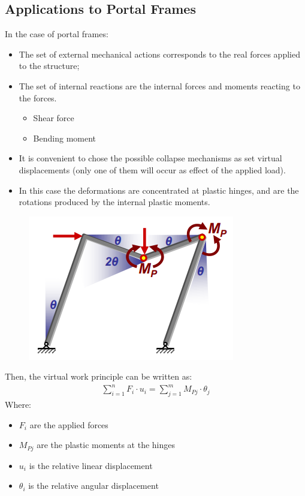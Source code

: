 \documentclass[class=report, crop=false, 12pt,a4paper]{standalone}
\begin{document}
\subsection{Applications to Portal Frames}
In the case of portal frames:
\begin{itemize}
  \item The set of external mechanical actions corresponds to the real forces applied to the structure;
  \item The set of internal reactions are the internal forces and moments reacting to the forces.
  \begin{itemize}
    \item Shear force
    \item Bending moment
  \end{itemize}
  \item It is convenient to chose the possible collapse mechanisms as set virtual displacements (only one of them will occur as effect of the applied load).
  \item In this case the deformations are concentrated at plastic hinges, and are the rotations produced by the internal plastic moments. 
\end{itemize}
\begin{figure}[H]
  \centering
  \includegraphics[width = 0.5 \textwidth]{../img/beam40.PNG}
\end{figure}
Then, the virtual work principle can be written as:
\begin{gather}
  \sum_{i=1}^{n}F_i\cdot u_i = \sum_{j=1}^{m} M_{Pj}\cdot\theta_j
\end{gather}
Where:
\begin{itemize}
  \item $F_i$ are the applied forces
  \item $M_{Pj}$ are the plastic moments at the hinges
  \item $u_i$ is the relative linear displacement
  \item $\theta_i$ is the relative angular displacement
\end{itemize}
\end{document}
